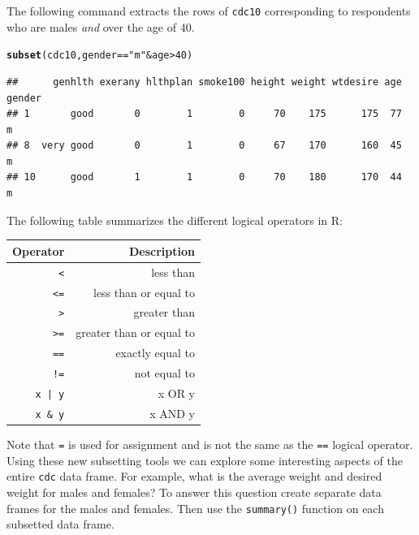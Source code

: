\documentclass[11pt]{article}\usepackage[]{graphicx}\usepackage[]{color}
\makeatletter
\newcommand{\hlnum}[1]{\textcolor[rgb]{0.686,0.059,0.569}{#1}}%
\newcommand{\hlstr}[1]{\textcolor[rgb]{0.192,0.494,0.8}{#1}}%
\newcommand{\hlopt}[1]{\textcolor[rgb]{0,0,0}{#1}}%
\newcommand{\hlstd}[1]{\textcolor[rgb]{0.345,0.345,0.345}{#1}}%
\newcommand{\hlkwd}[1]{\textcolor[rgb]{0.737,0.353,0.396}{\textbf{#1}}}%
\newenvironment{kframe}{%
 \def\at@end@of@kframe{}%
 \ifinner\ifhmode%
  \def\at@end@of@kframe{\end{minipage}}%
  \begin{minipage}{\columnwidth}%
 \fi\fi%
 \def\FrameCommand##1{\hskip\@totalleftmargin \hskip-\fboxsep
 \colorbox{shadecolor}{##1}\hskip-\fboxsep
     \hskip-\linewidth \hskip-\@totalleftmargin \hskip\columnwidth}%
 \MakeFramed {\advance\hsize-\width
   \@totalleftmargin\z@ \linewidth\hsize
   \@setminipage}}%
 {\par\unskip\endMakeFramed%
 \at@end@of@kframe}
\newenvironment{knitrout}{}{} %
\makeatother
\begin{document}
The following command extracts the rows of \texttt{cdc10} corresponding to respondents who are males \emph{and} over the age of 40.  
\begin{knitrout}
\color{fgcolor}\begin{kframe}
\begin{alltt}
\hlkwd{subset}\hlstd{(cdc10, gender} \hlopt{==} \hlstr{"m"} \hlopt{&} \hlstd{age} \hlopt{>} \hlnum{40}\hlstd{)}
\end{alltt}
\begin{verbatim}
##      genhlth exerany hlthplan smoke100 height weight wtdesire age gender
## 1       good       0        1        0     70    175      175  77      m
## 8  very good       0        1        0     67    170      160  45      m
## 10      good       1        1        0     70    180      170  44      m
\end{verbatim}
\end{kframe}
\end{knitrout}

The following table summarizes the different logical operators in R:
\begin{center}
\begin{tabular}{|r|r|}
\hline
Operator & Description\\
\hline
\texttt{<} & less than\\
\texttt{<=} & less than or equal to\\
\texttt{>} & greater than\\
\texttt{>=} & greater than or equal to\\
\texttt{==} & exactly equal to\\
\texttt{!=} & not equal to\\
\texttt{x | y} & x OR y\\
\texttt{x \& y} & x AND y\\
\hline
\end{tabular}
\end{center}
Note that \texttt{=} is used for assignment and is not the same as the \texttt{==} logical operator.\\

\newpage
Using these new subsetting tools we can explore some interesting aspects of the entire \texttt{cdc} data frame.  For example, what is the average weight and desired weight for males and females?  To answer this question create separate data frames for the males and females.  Then use the \texttt{summary()} function on each subsetted data frame.
\end{document}
